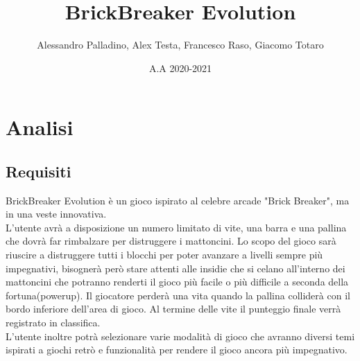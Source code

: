 \documentclass[a4paper,12pt]{report}
\title{BrickBreaker Evolution}
\author{Alessandro Palladino, Alex Testa, Francesco Raso, Giacomo Totaro}
\date{A.A 2020-2021}
\begin{document}
\maketitle

\tableofcontents %

\chapter{Analisi}
\section{Requisiti }
    BrickBreaker Evolution è un gioco ispirato al celebre arcade "Brick Breaker", ma in una veste innovativa.
    \\
    L'utente avrà a disposizione un numero limitato di vite, una barra e una pallina che dovrà far rimbalzare per distruggere i mattoncini. Lo scopo del gioco sarà riuscire a distruggere tutti i blocchi per poter avanzare a livelli sempre più impegnativi, bisognerà però stare attenti alle insidie che si celano all'interno dei mattoncini che potranno renderti il gioco più facile o più difficile a seconda della fortuna(powerup). Il giocatore perderà una vita quando la pallina colliderà con il bordo inferiore dell'area di gioco. Al termine delle vite il punteggio finale verrà registrato in classifica.
    \\
    L'utente inoltre potrà selezionare varie modalità di gioco che avranno diversi temi ispirati a giochi retrò e funzionalità per rendere il gioco ancora più impegnativo.
    
\end{document}
